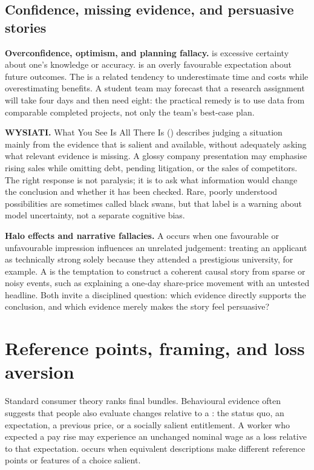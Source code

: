 \subsection{Confidence, missing evidence, and persuasive stories}

\textbf{Overconfidence, optimism, and planning fallacy.}
 is excessive certainty about one's knowledge or
accuracy.  is an overly favourable expectation about
future outcomes. The  is a related tendency to
underestimate time and costs while overestimating benefits. A student team may
forecast that a research assignment will take four days and then need eight:
the practical remedy is to use data from comparable completed projects, not
only the team's best-case plan.

\textbf{WYSIATI.} What You See Is All There Is
() describes judging a situation mainly from the evidence
that is salient and available, without adequately asking what relevant
evidence is missing. A glossy company presentation may emphasise rising sales
while omitting debt, pending litigation, or the sales of competitors. The
right response is not paralysis; it is to ask what information would change
the conclusion and whether it has been checked. Rare, poorly understood
possibilities are sometimes called black swans, but that label is a warning
about model uncertainty, not a separate cognitive bias.

\textbf{Halo effects and narrative fallacies.} A  occurs
when one favourable or unfavourable impression influences an unrelated
judgement: treating an applicant as technically strong solely because they
attended a prestigious university, for example. A 
is the temptation to construct a coherent causal story from sparse or noisy
events, such as explaining a one-day share-price movement with an untested
headline. Both invite a disciplined question: which evidence directly supports
the conclusion, and which evidence merely makes the story feel persuasive?

\section{Reference points, framing, and loss aversion}

Standard consumer theory ranks final bundles. Behavioural evidence often
suggests that people also evaluate changes relative to a
: the status quo, an expectation, a previous price,
or a socially salient entitlement. A worker who expected a pay rise may
experience an unchanged nominal wage as a loss relative to that expectation.
 occurs when equivalent descriptions make different reference
points or features of a choice salient.


